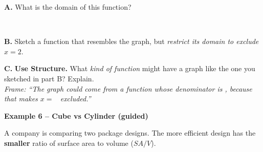 \documentclass[11pt]{article}
\newcommand{\frameblank}{\underline{\hspace{4em}}}
\newcommand{\writeline}{\rule[-2pt]{0pt}{12pt}}
\begin{document}
\textbf{A.} What is the domain of this function? \\
\writeline \\[6pt]
\writeline

\vspace{0.3em}
\textbf{B.} Sketch a function that resembles the graph, but \emph{restrict its domain to exclude} $x = 2$.

\begin{center}
\end{center}

\vspace{0.3em}
\textbf{C.}\; \textbf{Use Structure.}\; What \emph{kind of function} might have a graph like the one you sketched in part B? Explain. \\
{\small\itshape Frame: ``The graph could come from a function whose denominator is \frameblank, because that makes $x = $ \frameblank\ excluded.''}\\
\writeline

\newpage

\textbf{Example 6 -- Cube vs Cylinder (guided)}

\vspace{0.2em}
A company is comparing two package designs. The more efficient design has the \textbf{smaller} ratio of surface area to volume ($SA/V$).
\end{document}
